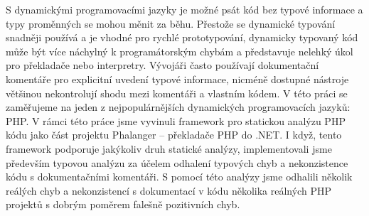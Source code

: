 S dynamickými programovacími jazyky je možné psát kód bez 
typové informace a typy proměnných se mohou měnit za běhu. 
Přestože se dynamické typování snadněji používá a je vhodné pro 
rychlé prototypování, dynamicky typovaný kód může být více 
náchylný k programátorským chybám a představuje nelehký úkol 
pro překladače nebo interpretry. Vývojáři často používají 
dokumentační komentáře pro explicitní uvedení typové informace, 
nicméně dostupné nástroje většinou nekontrolují shodu mezi 
komentáři a vlastním kódem. V této práci se zaměřujeme na 
jeden z nejpopulárnějších dynamických programovacích jazyků: PHP. 
V rámci této práce jsme vyvinuli framework pro statickou analýzu 
PHP kódu jako část projektu Phalanger -- překladače PHP do .NET. 
I když, tento framework podporuje jakýkoliv druh statické analýzy, 
implementovali jsme především typovou analýzu za účelem odhalení 
typových chyb a nekonzistence kódu s dokumentačními komentáři. 
S pomocí této analýzy jsme odhalili několik reálých chyb a 
nekonzistencí s dokumentací v kódu několika reálných PHP 
projektů s dobrým poměrem falešně pozitivních chyb.